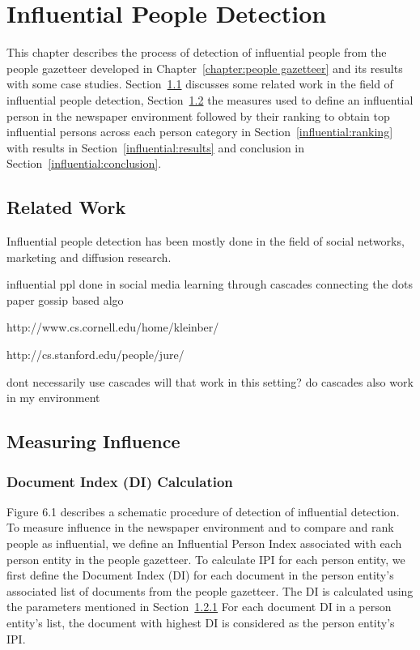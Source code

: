 \chapter{Influential People Detection}\label{chapter:influential people detection}

This chapter describes the process of detection of influential people from the people gazetteer developed in Chapter~\ref{chapter:people gazetteer} and its results with some case studies. Section~\ref{influential:rw} discusses some related work in the field of influential people detection, Section~\ref{influential:measure} the measures used to define an influential person in the newspaper environment followed by their ranking to obtain top influential persons across each person category in  Section~\ref{influential:ranking} with results in Section~\ref{influential:results} and conclusion in Section~\ref{influential:conclusion}.

 
\section{Related Work}
\label{influential:rw}

Influential people detection has been mostly done in the field of social networks, marketing and diffusion research.

influential ppl done in social media 
learning through cascades
connecting the dots paper
gossip based algo

http://www.cs.cornell.edu/home/kleinber/

http://cs.stanford.edu/people/jure/

dont necessarily use cascades
will that work in this setting?
do cascades also work in my environment

\section{Measuring Influence}
\label{influential:measure}



\subsection{Document Index (DI) Calculation}

 Figure 6.1 describes a schematic procedure of detection of influential detection. To measure influence in the newspaper environment and to compare and rank people as influential, we define an Influential Person Index associated with each person entity in the people gazetteer. To calculate IPI for each person entity, we first define the Document Index (DI) for each document in the person entity's associated list of documents from the people gazetteer. The DI is calculated using the parameters mentioned in Section~\ref{}
For each document DI in a person entity's list, the document with highest DI is considered as the person entity's IPI. 

